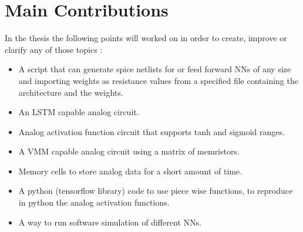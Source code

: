 \section{Main Contributions}
\label{sec:contributions}

In the thesis the following points will worked on in order to create, improve or clarify any of those topics :

\begin{itemize}
\item A script that can generate spice netlists for  or feed forward \aclp{NN} of any size and importing weights as resistance values from a specified file containing the architecture and the weights.
\item An \ac{LSTM} capable analog circuit.
\item Analog activation function circuit that supports \ac{tanh} and sigmoid ranges.
\item A \ac{VMM} capable analog circuit using a matrix of memristors.
\item Memory cells to store analog data for a short amount of time.
\item A python (tensorflow library) code to use piece wise functions, to reproduce in python the analog activation functions.
\item A way to run software simulation of different \acp{NN}.
\end{itemize}

